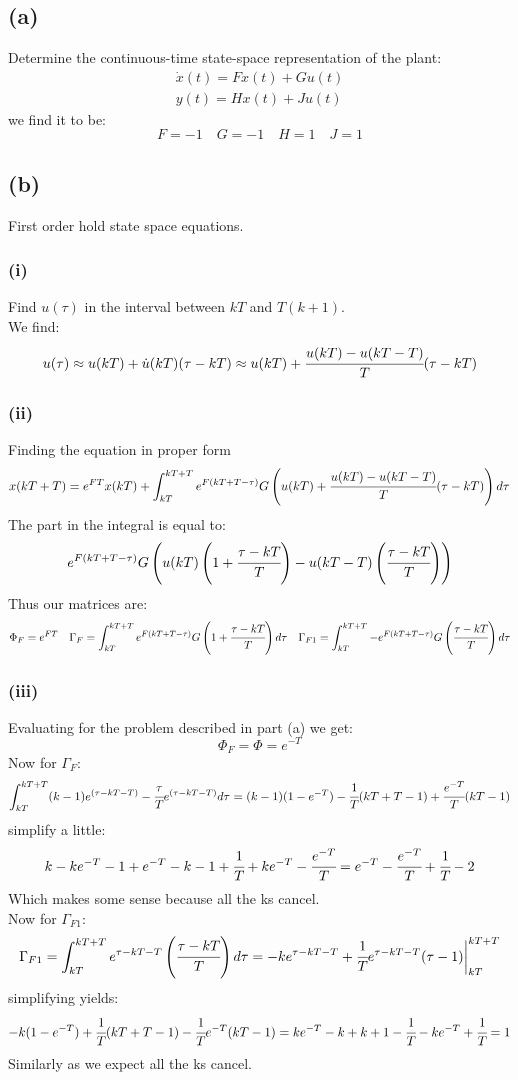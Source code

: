\documentclass{article}
\begin{document}
\subsection*{(a)}
Determine the continuous-time state-space representation of the plant:
\[\begin{split}\dot{x}(t)=Fx(t)+Gu(t)\\y(t)=Hx(t)+Ju(t)\end{split}\]
we find it to be:
\[F=-1\quad G=-1\quad H=1\quad J=1\]
\subsection*{(b)}
First order hold state space equations.
\subsubsection*{(i)}
Find $u(\tau)$ in the interval between $kT$ and $T(k+1)$.\\
We find:
\[u(\tau)\approx u(kT)+\dot{u}(kT)(\tau-kT)\approx u(kT)+\cfrac{u(kT)-u(kT-T)}{T}(\tau-kT)\]
\subsubsection*{(ii)}
Finding the equation in proper form
\[x(kT+T)=e^{FT}x(kT)+\int_{kT}^{kT+T}e^{F(kT+T-\tau)}G\left (u(kT)+\cfrac{u(kT)-u(kT-T)}{T}(\tau-kT)\right )d\tau\]
The part in the integral is equal to:
\[e^{F(kT+T-\tau)}G\left (u(kT)\left (1+\cfrac{\tau-kT}{T}\right)-u(kT-T)\left (\cfrac{\tau-kT}{T}\right )\right )\]
Thus our matrices are:
\[\Phi_F=e^{FT}\quad \Gamma_F=\int_{kT}^{kT+T}e^{F(kT+T-\tau)}G\left (1+\cfrac{\tau-kT}{T}\right )d\tau\quad \Gamma_{F1}=\int_{kT}^{kT+T}-e^{F(kT+T-\tau)}G\left (\cfrac{\tau-kT}{T}\right )d\tau\]

\subsubsection*{(iii)}
Evaluating for the problem described in part (a) we get:
\[\Phi_F=\Phi=e^{-T}\]
Now for $\Gamma_F$:
\[\int_{kT}^{kT+T}(k-1)e^{(\tau-kT-T)}-\cfrac{\tau}{T}e^{(\tau-kT-T)}d\tau=(k-1)(1-e^{-T})-\cfrac{1}{T}(kT+T-1)+\cfrac{e^{-T}}{T}(kT-1)\]
simplify a little:
\[k-ke^{-T}-1+e^{-T}-k-1+\cfrac{1}{T}+ke^{-T}-\cfrac{e^{-T}}{T}=e^{-T}-\cfrac{e^{-T}}{T}+\cfrac{1}{T}-2\]
Which makes some sense because all the ks cancel.\\
Now for $\Gamma_{F1}$:
\[\Gamma_{F1}=\int_{kT}^{kT+T}e^{\tau-kT-T}\left (\cfrac{\tau-kT}{T}\right )d\tau=-ke^{\tau-kT-T}+\cfrac{1}{T}e^{\tau-kT-T}(\tau-1)\bigg|_{kT}^{kT+T}\]
simplifying yields:
\[-k(1-e^{-T})+\cfrac{1}{T}(kT+T-1)-\cfrac{1}{T}e^{-T}(kT-1)=ke^{-T}-k+k+1-\cfrac{1}{T}-ke^{-T}+\cfrac{1}{T}=1\]
Similarly as we expect all the ks cancel.
\end{document}
